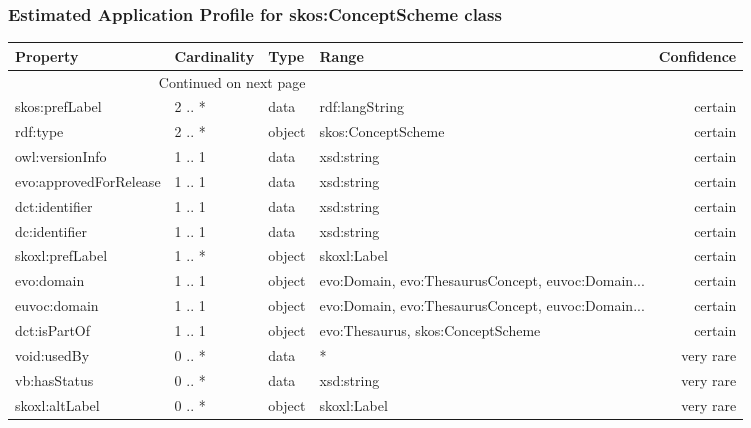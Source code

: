 \documentclass[10pt,a4paper,titlepage,final]{article}
\begin{document}
\subsubsection{Estimated Application Profile for skos:ConceptScheme class}
\begin{tabularx}{\textwidth}{lllXr}
\toprule
               Property & Cardinality &    Type &                                              Range & Confidence \\
\midrule
\endhead
\midrule
\multicolumn{3}{r}{{Continued on next page}} \\
\midrule
\endfoot

\bottomrule
\endlastfoot
         skos:prefLabel &      2 .. * &    data &                                     rdf:langString &    certain \\
               rdf:type &      2 .. * &  object &                                 skos:ConceptScheme &    certain \\
        owl:versionInfo &      1 .. 1 &    data &                                         xsd:string &    certain \\
 evo:approvedForRelease &      1 .. 1 &    data &                                         xsd:string &    certain \\
         dct:identifier &      1 .. 1 &    data &                                         xsd:string &    certain \\
          dc:identifier &      1 .. 1 &    data &                                         xsd:string &    certain \\
        skoxl:prefLabel &      1 .. * &  object &                                        skoxl:Label &    certain \\
             evo:domain &      1 .. 1 &  object &  evo:Domain, evo:ThesaurusConcept, euvoc:Domain... &    certain \\
           euvoc:domain &      1 .. 1 &  object &  evo:Domain, evo:ThesaurusConcept, euvoc:Domain... &    certain \\
           dct:isPartOf &      1 .. 1 &  object &                  evo:Thesaurus, skos:ConceptScheme &    certain \\
            void:usedBy &      0 .. * &    data &                                                  * &  very rare \\
           vb:hasStatus &      0 .. * &    data &                                         xsd:string &  very rare \\
         skoxl:altLabel &      0 .. * &  object &                                        skoxl:Label &  very rare \\

\end{tabularx}
\end{document}
